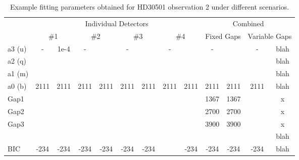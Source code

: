\begin{table}
    \small
    \caption{Example fitting parameters obtained for HD30501 observation 2 under different scenarios.}
    \begin{tabular}{|l|c|c|c|c|c|c|c|c|c|c|c|c|}
    	\toprule
    	~    &    \multicolumn{8}{c|}{Individual Detectors}    &    \multicolumn{4}{c|}{Combined}    \\
    	~    & \multicolumn{2}{c|}{\#1} & \multicolumn{2}{c|}{\#2} & \multicolumn{2}{c|}{\#3} & \multicolumn{2}{c|}{\#4} & \multicolumn{2}{c|}{Fixed Gaps} & \multicolumn{2}{c|}{Variable Gaps} \\ \midrule
    	a3 (u)    &  -   &    1e-4    &  -   &    &  -   &    &  -   &    &  -   &    &  -   &    blah    \\
    	a2 (q)    &      &    &    &    &    &    &    &    &    &    &    &    blah    \\
    	a1 (m)   &      &    &    &    &    &    &    &    &    &    &    &    blah    \\
    	a0 (b)    & 2111 &    2111    & 2111 &    2111    & 2111 &    2111    & 2111 &    2111    & 2111 &    2111    & 2111 & blah \\
        Gap1 &      &    &    &    &    &    &    &    &   1367  & 1367   &   & x\\
        Gap2 &      &    &    &    &    &    &    &    &  2700   &  2700  &   & x\\
        Gap3 &      &    &    &    &    &    &    &    &   3900 &   3900 &    & x\\
    	\textchisquared{} &    &    &    &    &    &    &    &    &    &    &    &    blah    \\
    	BIC        & -234      &    -234    & -234 &    -234    & -234 &    -234    &    &    -234    & -234 &    -234    & -234 &    blah  \\ 
        \bottomrule
    \end{tabular}\label{tab:example_calibration_parametres}
\end{table}


